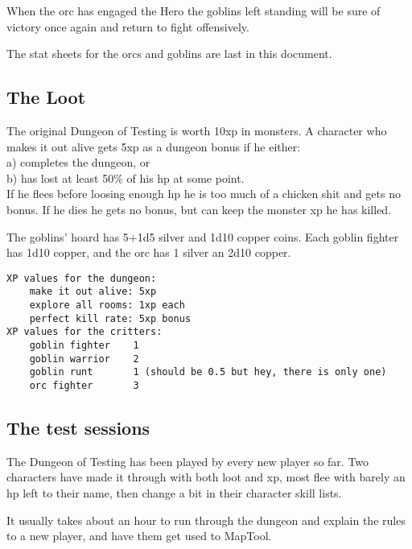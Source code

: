 When the orc has engaged the Hero the goblins left standing will be sure of victory once again and return to fight offensively.

The stat sheets for the orcs and goblins are last in this document.


\subsection*{The Loot}

The original Dungeon of Testing is worth 10xp in monsters. A character who makes it out alive gets 5xp as a dungeon bonus if he either: \\
a) completes the dungeon, or \\
b) has lost at least 50\% of his hp at some point. \\
If he flees before loosing enough hp he is too much of a chicken shit and gets no bonus. If he dies he gets no bonus, but can keep the monster xp he has killed.

The goblins' hoard has 5+1d5 silver and 1d10 copper coins.
Each goblin fighter has 1d10 copper, and the orc has 1 silver an 2d10 copper.

\small \begin{verbatim}
XP values for the dungeon:
    make it out alive: 5xp
    explore all rooms: 1xp each
    perfect kill rate: 5xp bonus
XP values for the critters:
    goblin fighter    1
    goblin warrior    2
    goblin runt       1 (should be 0.5 but hey, there is only one)
    orc fighter       3
\end{verbatim} \normalsize




\subsection*{The test sessions}

The Dungeon of Testing has been played by every new player so far. Two characters have made it through with both loot and xp, most flee with barely an hp left to their name, then change a bit in their character skill lists.

It usually takes about an hour to run through the dungeon and explain the rules to a new player, and have them get used to MapTool.







